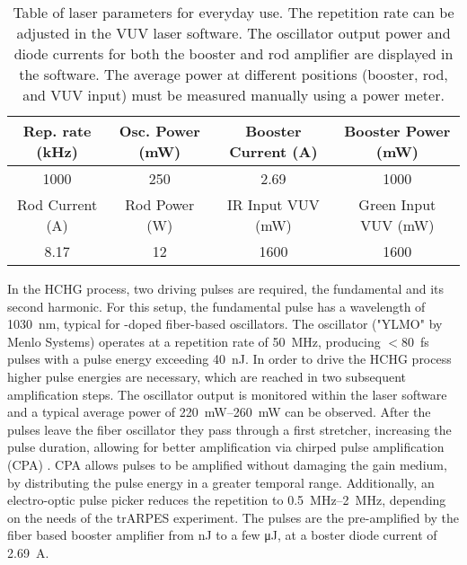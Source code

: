 \begin{table}[t]
	\centering
	\begin{tabular}{ *{4}{c} }
		\hline
		Rep. rate (\unit{\kilo\hertz})		& Osc. Power (\unit{\milli\watt}) 	& Booster Current (\unit{\ampere}) 		 & Booster Power (\unit{\milli\watt})	\\ \hline\hline
		1000								& 250							  	& 2.69								  	 & 1000									\\ \hline
		Rod Current (\unit{\ampere}) 		& Rod Power (\unit{\watt})			& IR Input VUV (\unit{\milli\watt})		 & Green Input VUV (\unit{\milli\watt})	\\ \hline\hline
		8.17								& 12					  			& 1600								   	 & 1600									\\ \hline
	\end{tabular}
	\caption{Table of laser parameters for everyday use. The repetition rate can be adjusted in the VUV laser software. The oscillator output power and diode currents for both the booster and rod amplifier are displayed in the software. The average power at different positions (booster, rod, and VUV input) must be measured manually using a power meter.}
	\label{tab:laser_param}
\end{table}

In the HCHG process, two driving pulses are required, the fundamental and its second harmonic.
For this setup, the fundamental pulse has a wavelength of \qty{1030}{\nano\meter}, typical for -doped fiber-based oscillators.
The oscillator ("YLMO" by Menlo Systems) operates at a repetition rate of \qty{50}{\mega\hertz}, producing $<$\qty{80}{\femto\second} pulses with a pulse energy exceeding \qty{40}{\nano\joule}.
In order to drive the HCHG process higher pulse energies are necessary, which are reached in two subsequent amplification steps.
The oscillator output is monitored within the laser software and a typical average power of \qtyrange{220}{260}{\milli\watt} can be observed.
After the pulses leave the fiber oscillator they pass through a first stretcher, increasing the pulse duration, allowing for better amplification via chirped pulse amplification (CPA) \cite{strickland_compression_1985,maine_generation_1988,strickland_chirped_2021}.
CPA allows pulses to be amplified without damaging the gain medium, by distributing the pulse energy in a greater temporal range. Additionally, an electro-optic pulse picker reduces the repetition to \qtyrange{0.5}{2}{\mega\hertz}, depending on the needs of the trARPES experiment.
The pulses are the pre-amplified by the fiber based booster amplifier from \unit{\nano\joule} to a few \unit{\micro\joule}, at a boster diode current of \qty{2.69}{\ampere}.

